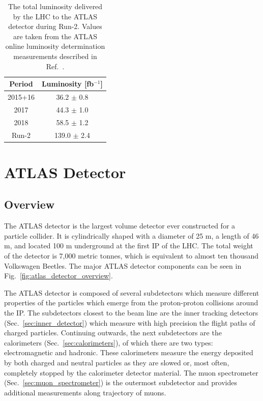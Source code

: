 \begin{table}
\centering
\begin{tabular}{|c|c|} 
\hline
Period & Luminosity [fb$^{-1}$] \\
\hline\hline
2015+16 & 36.2 $\pm$ 0.8 \\ 
\hline
2017 & 44.3 $\pm$ 1.0 \\
\hline
2018 & 58.5 $\pm$ 1.2 \\
\hline\hline
Run-2 & 139.0 $\pm$ 2.4 \\
\hline
\end{tabular}
\caption{
    The total luminosity delivered by the LHC to the ATLAS detector during Run-2.
    Values are taken from the ATLAS online luminosity determination measurements described in Ref.~\cite{ATLAS-CONF-2019-021}.
}
\label{tab:lumi_vs_period}
\end{table}

\section{ATLAS Detector}

\subsection{Overview}
The ATLAS detector is the largest volume detector ever constructed for a particle collider.
It is cylindrically shaped with a diameter of 25 m, a length of 46 m, and located 100 m underground at the first IP of the LHC.
The total weight of the detector is 7,000 metric tonnes, which is equivalent to almost ten thousand Volkswagen Beetles.
The major ATLAS detector components can be seen in Fig.~\ref{fig:atlas_detector_overview}.

The ATLAS detector is composed of several subdetectors which measure different properties of the particles which emerge from the proton-proton collisions around the IP.
The subdetectors closest to the beam line are the inner tracking detectors (Sec.~\ref{sec:inner_detector}) which measure with high precision the flight paths of charged particles.
Continuing outwards, the next subdetectors are the calorimeters (Sec.~\ref{sec:calorimeters}), of which there are two types: electromagnetic and hadronic.
These calorimeters measure the energy deposited by both charged and neutral particles as they are slowed or, most often, completely stopped by the calorimeter detector material.
The muon spectrometer (Sec.~\ref{sec:muon_spectrometer}) is the outermost subdetector and provides additional measurements along trajectory of muons.


